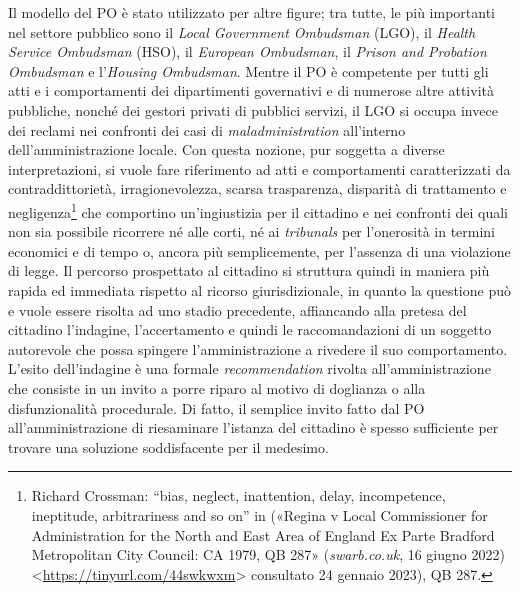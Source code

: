\documentclass[12pt,it,a4paper,]{report}
\begin{document}
Il modello del PO è stato utilizzato per altre figure; tra tutte, le più
importanti nel settore pubblico sono il \emph{Local Government
Ombudsman} (LGO), il \emph{Health Service Ombudsman} (HSO), il
\emph{European Ombudsman}, il \emph{Prison and Probation Ombudsman} e
l'\emph{Housing Ombudsman}. Mentre il PO è competente per tutti gli atti
e i comportamenti dei dipartimenti governativi e di numerose altre
attività pubbliche, nonché dei gestori privati di pubblici servizi, il
LGO si occupa invece dei reclami nei confronti dei casi di
\emph{maladministration} all'interno dell'amministrazione locale. Con
questa nozione, pur soggetta a diverse interpretazioni, si vuole fare
riferimento ad atti e comportamenti caratterizzati da contraddittorietà,
irragionevolezza, scarsa trasparenza, disparità di trattamento e
negligenza\footnote{Richard Crossman: ``bias, neglect, inattention,
  delay, incompetence, ineptitude, arbitrariness and so on'' in
  ({«Regina v Local Commissioner for Administration for the North and
  East Area of England Ex Parte Bradford Metropolitan City Council: CA
  1979, QB 287»} (\emph{swarb.co.uk}, 16 giugno 2022)
  \textless{}\url{https://tinyurl.com/44swkwxm}\textgreater{} consultato
  24 gennaio 2023), QB 287.} che comportino un'ingiustizia per il
cittadino e nei confronti dei quali non sia possibile ricorrere né alle
corti, né ai \emph{tribunals} per l'onerosità in termini economici e di
tempo o, ancora più semplicemente, per l'assenza di una violazione di
legge. Il percorso prospettato al cittadino si struttura quindi in
maniera più rapida ed immediata rispetto al ricorso giurisdizionale, in
quanto la questione può e vuole essere risolta ad uno stadio precedente,
affiancando alla pretesa del cittadino l'indagine, l'accertamento e
quindi le raccomandazioni di un soggetto autorevole che possa spingere
l'amministrazione a rivedere il suo comportamento. L'esito dell'indagine
è una formale \emph{recommendation} rivolta all'amministrazione che
consiste in un invito a porre riparo al motivo di doglianza o alla
disfunzionalità procedurale. Di fatto, il semplice invito fatto dal PO
all'amministrazione di riesaminare l'istanza del cittadino è spesso
sufficiente per trovare una soluzione soddisfacente per il medesimo.
\end{document}

